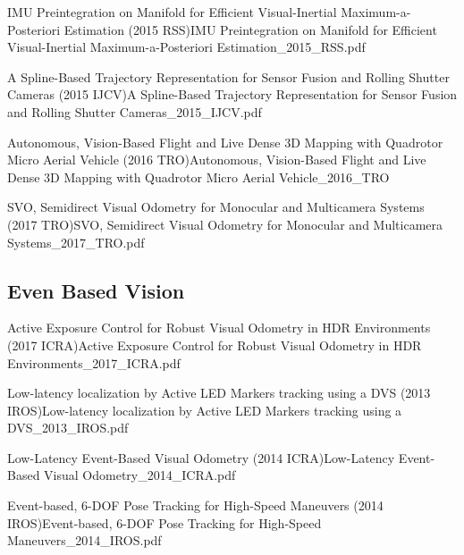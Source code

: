 \documentclass[10pt,a4paper]{scrartcl}
\begin{document}
\begin{multicols*}{2}
\begin{Paper}{IMU Preintegration on Manifold for Efficient Visual-Inertial Maximum-a-Posteriori Estimation (2015 RSS)}{IMU Preintegration on Manifold for Efficient Visual-Inertial Maximum-a-Posteriori Estimation_2015_RSS.pdf}
\end{Paper}

\begin{Paper}{A Spline-Based Trajectory Representation for Sensor Fusion and Rolling Shutter Cameras (2015 IJCV)}{A Spline-Based Trajectory Representation for Sensor Fusion and Rolling Shutter Cameras_2015_IJCV.pdf}
\end{Paper}

\begin{Paper}{Autonomous, Vision-Based Flight and Live Dense 3D Mapping with Quadrotor Micro Aerial Vehicle (2016 TRO)}{Autonomous, Vision-Based Flight and Live Dense 3D Mapping with Quadrotor Micro Aerial Vehicle_2016_TRO}
\end{Paper}

\begin{Paper}{SVO, Semidirect Visual Odometry for Monocular and Multicamera Systems (2017 TRO)}{SVO, Semidirect Visual Odometry for Monocular and Multicamera Systems_2017_TRO.pdf}
\end{Paper}

\subsection{Even Based Vision}

\begin{Paper}{Active Exposure Control for Robust Visual Odometry in HDR Environments (2017 ICRA)}{Active Exposure Control for Robust Visual Odometry in HDR Environments_2017_ICRA.pdf}
\end{Paper}

\begin{Paper}{Low-latency localization by Active LED Markers tracking using a DVS (2013 IROS)}{Low-latency localization by Active LED Markers tracking using a DVS_2013_IROS.pdf}
\end{Paper}

\begin{Paper}{Low-Latency Event-Based Visual Odometry (2014 ICRA)}{Low-Latency Event-Based Visual Odometry_2014_ICRA.pdf}
\end{Paper}

\begin{Paper}{Event-based, 6-DOF Pose Tracking for High-Speed Maneuvers (2014 IROS)}{Event-based, 6-DOF Pose Tracking for High-Speed Maneuvers_2014_IROS.pdf}
\end{Paper}


\end{multicols*}
\end{document}
